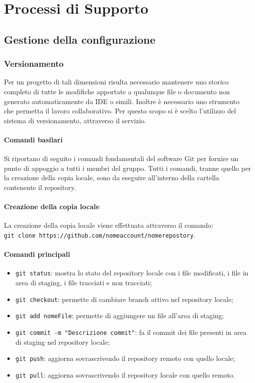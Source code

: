 \chapter{Processi di Supporto}
\section{Gestione della configurazione}
\subsection{Versionamento}
Per un progetto di tali dimensioni risulta necessario mantenere uno storico completo di tutte le modifiche apportate a qualunque file o documento non generato automaticamente da IDE o simili. Inoltre è necessario uno strumento che permetta il lavoro collaborativo. Per questo scopo si è scelto l'utilizzo del sistema di versionamento, attraverso il servizio.
\subsubsection{Comandi basilari}
Si riportano di seguito i comandi fondamentali del software Git per fornire un punto di appoggio a tutti i membri del gruppo. Tutti i comandi, tranne quello per la creazione della copia locale, sono da eseguire all'interno della cartella contenente il repository.
\subsubsection{Creazione della copia locale}
La creazione della copia locale viene effettuata attraverso il comando:\\
\texttt{git clone https://github.com/nomeaccount/nomerepostory}.
\subsubsection{Comandi principali}
\begin{itemize}
	\item \texttt{git status}: mostra lo stato del repository locale con i file modificati, i file in area di staging, i file tracciati e non tracciati;
	\item \texttt{git checkout}: permette di cambiare branch attivo nel repository locale;
	\item \texttt{git add nomeFile}: permette di aggiungere un file all'area di staging;
	\item \texttt{git commit -m "Descrizione commit"}: fa il commit dei file presenti in area di staging nel repository locale;
	\item \texttt{git push}: aggiorna sovrascrivendo il repository remoto con quello locale;
	\item \texttt{git pull}: aggiorna sovrascrivendo il repository locale con quello remoto.
\end{itemize}
